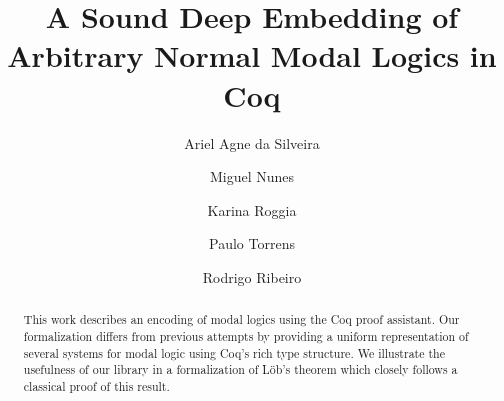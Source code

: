 \documentclass[sigconf]{acmart}
\begin{document}
\title{A Sound Deep Embedding of Arbitrary Normal Modal Logics in Coq}


\author{Ariel Agne da Silveira}

\author{Miguel Nunes}

\author{Karina Roggia}

\author{Paulo Torrens}

\author{Rodrigo Ribeiro}

\renewcommand{\shortauthors}{da Silveira et al.}

\begin{abstract}
  This work describes an encoding of modal logics using the Coq proof assistant.
  Our formalization differs from previous attempts by providing a uniform
  representation of several systems for modal logic using Coq's rich type
  structure. We illustrate the usefulness of our library in a formalization of
  L\"ob's theorem which closely follows a classical proof of this result.
\end{abstract}


\end{document}
